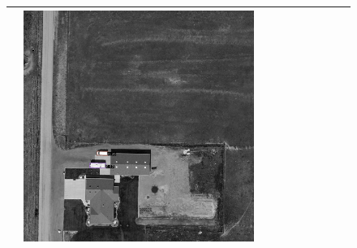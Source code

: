 \begin{figure}[h!]
\begin{tabularx}{\textwidth}{c|*{9}{X}}
    & \includegraphics[trim={300pt 355pt 610pt 570pt},clip,width=\linewidth]{images/015Results/03ablation/comp_images/blue/198.png} \\ \hline


\end{tabularx}
\end{figure}
